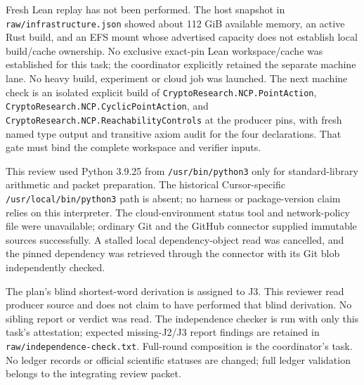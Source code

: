 \documentclass[10pt]{article}
\begin{document}
Fresh Lean replay has not been performed. The host snapshot in \texttt{raw\allowbreak{}/\allowbreak{}infrastructure\allowbreak{}.\allowbreak{}json} showed about 112 GiB available memory, an active Rust build, and an EFS mount whose advertised capacity does not establish local build/cache ownership. No exclusive exact-pin Lean workspace/cache was established for this task; the coordinator explicitly retained the separate machine lane. No heavy build, experiment or cloud job was launched. The next machine check is an isolated explicit build of \texttt{CryptoResearch\allowbreak{}.\allowbreak{}NCP\allowbreak{}.\allowbreak{}PointAction}, \texttt{CryptoResearch\allowbreak{}.\allowbreak{}NCP\allowbreak{}.\allowbreak{}CyclicPointAction}, and \texttt{CryptoResearch\allowbreak{}.\allowbreak{}NCP\allowbreak{}.\allowbreak{}ReachabilityControls} at the producer pins, with fresh named type output and transitive axiom audit for the four declarations. That gate must bind the complete workspace and verifier inputs.


This review used Python 3.9.25 from \texttt{\allowbreak{}/\allowbreak{}usr\allowbreak{}/\allowbreak{}bin\allowbreak{}/\allowbreak{}python3} only for standard-library arithmetic and packet preparation. The historical Cursor-specific \texttt{\allowbreak{}/\allowbreak{}usr\allowbreak{}/\allowbreak{}local\allowbreak{}/\allowbreak{}bin\allowbreak{}/\allowbreak{}python3} path is absent; no harness or package-version claim relies on this interpreter. The cloud-environment status tool and network-policy file were unavailable; ordinary Git and the GitHub connector supplied immutable sources successfully. A stalled local dependency-object read was cancelled, and the pinned dependency was retrieved through the connector with its Git blob independently checked.


The plan's blind shortest-word derivation is assigned to J3. This reviewer read producer source and does not claim to have performed that blind derivation. No sibling report or verdict was read. The independence checker is run with only this task's attestation; expected missing-J2/J3 report findings are retained in \texttt{raw\allowbreak{}/\allowbreak{}independence\allowbreak{}-\allowbreak{}check\allowbreak{}.\allowbreak{}txt}. Full-round composition is the coordinator's task. No ledger records or official scientific statuses are changed; full ledger validation belongs to the integrating review packet.
\end{document}

